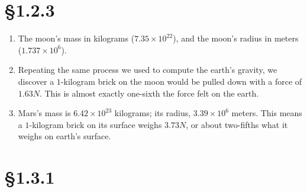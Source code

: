 \documentclass[10pt,letterpaper]{report}
\begin{document}
  \section{\S 1.2.3}

  \begin{enumerate}
  \item
    The moon's mass in kilograms ($7.35 \times 10^{22}$), and the
    moon's radius in meters ($1.737 \times 10^6$).
  \item
    Repeating the same process we used to compute the earth's gravity,
    we discover a $1$-kilogram brick on the moon would be pulled down
    with a force of $1.63N$.  This is almost exactly one-sixth the
    force felt on the earth.
  \item
    Mars's mass is $6.42 \times 10^{23}$ kilograms; its radius, $3.39
    \times 10^6$ meters.  This means a $1$-kilogram brick on its
    surface weighs $3.73N$, or about two-fifths what it weighs on earth's
    surface.
  \end{enumerate}

  \section{\S 1.3.1}
\end{document}

